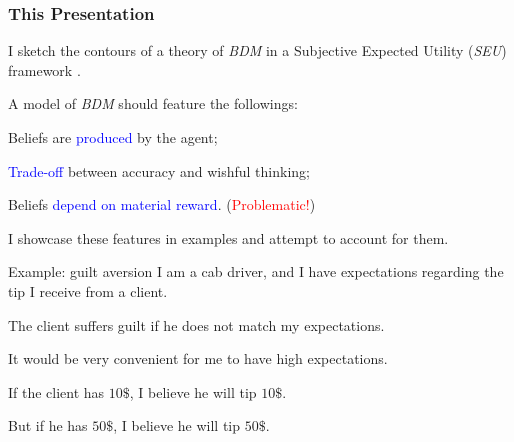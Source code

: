 \documentclass[usenames,dvipsnames,aspectratio=169,11pt,envcountsect, handout]{beamer}
\begin{document}
\begin{frame}\frametitle{This Presentation}

	I sketch the contours of a theory of \textit{BDM} in a Subjective Expected Utility (\textit{SEU}) framework \citep{savageFoundationsStatistics1972}.

	\vfill

	A model of \textit{BDM} should feature the followings:

	\vfill

	\begin{wideitemize}
		\item Beliefs are \textcolor{blue}{produced} by the agent;
		\item \textcolor{blue}{Trade-off} between accuracy and wishful thinking;
		\item Beliefs \textcolor{blue}{depend on material reward}. (\textcolor{red}{Problematic!})
	\end{wideitemize}

	\vfill

	I showcase these features in examples and attempt to account for them.


\end{frame}

\begin{frame}{Example: guilt aversion}
	I am a cab driver, and I have expectations regarding the tip I receive from a client.

	\vfill

	The client suffers guilt if he does not match my expectations.

	\vfill

	It would be very convenient for me to have high expectations.

	\vfill

	If the client has $10\$$, I believe he will tip $10\$$.

	\vfill

	But if he has $50\$$, I believe he will tip $50\$$.


\end{frame}
\end{document}
